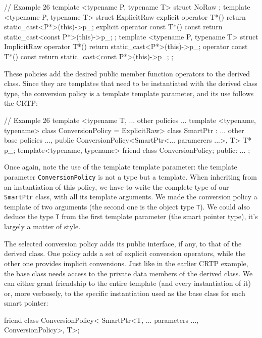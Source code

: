 \begin{code}
// Example 26
template <typename P, typename T> struct NoRaw {
};
template <typename P, typename T> struct ExplicitRaw {
  explicit operator T*() {
    return static_cast<P*>(this)->p_;
  }
  explicit operator const T*() const {
    return static_cast<const P*>(this)->p_;
  }
};
template <typename P, typename T> struct ImplicitRaw {
  operator T*() {
    return static_cast<P*>(this)->p_;
  }
  operator const T*() const {
    return static_cast<const P*>(this)->p_;
  }
};
\end{code}

These policies add the desired public member function operators to the derived class. Since they are templates that need to be instantiated with the derived class type, the conversion policy is a template template parameter, and its use follows the CRTP:

\begin{code}
// Example 26
template <typename T, ... other policies ...
          template <typename, typename>
          class ConversionPolicy = ExplicitRaw>
class SmartPtr : ... other base policies ...,
  public ConversionPolicy<SmartPtr<... paramerers ...>, T>
{
  T* p_;
  template<typename, typename>
  friend class ConversionPolicy;
  public:
  ...
};
\end{code}

Once again, note the use of the template template parameter: the template parameter \texttt{ConversionPolicy} is not a type but a template. When inheriting from an instantiation of this policy, we have to write the complete type of our \texttt{SmartPtr} class, with all its template arguments. We made the conversion policy a template of two arguments (the second one is the object type \texttt{T}). We could also deduce the type \texttt{T} from the first template parameter (the smart pointer type), it's largely a matter of style.

The selected conversion policy adds its public interface, if any, to that of the derived class. One policy adds a set of explicit conversion operators, while the other one provides implicit conversions. Just like in the earlier CRTP example, the base class needs access to the private data members of the derived class. We can either grant friendship to the entire template (and every instantiation of it) or, more verbosely, to the specific instantiation used as the base class for each smart pointer:

\begin{code}
friend class ConversionPolicy<
  SmartPtr<T, ... parameters ..., ConversionPolicy>, T>;
\end{code}

